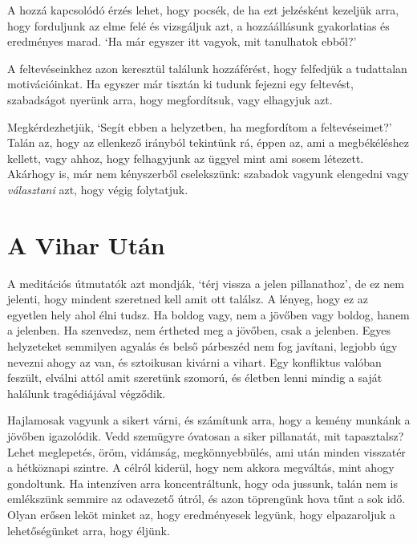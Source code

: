 
A hozzá kapcsolódó érzés lehet, hogy pocsék, de ha ezt jelzésként
kezeljük arra, hogy forduljunk az elme felé és vizsgáljuk azt, a
hozzáállásunk gyakorlatias és eredményes marad. `Ha már egyszer itt
vagyok, mit tanulhatok ebből?'

A feltevéseinkhez azon keresztül találunk hozzáférést, hogy felfedjük a
tudattalan motivációinkat. Ha egyszer már tisztán ki tudunk fejezni egy
feltevést, szabadságot nyerünk arra, hogy megfordítsuk, vagy elhagyjuk
azt.

Megkérdezhetjük, `Segít ebben a helyzetben, ha megfordítom a
feltevéseimet?' Talán az, hogy az ellenkező irányból tekintünk rá, éppen
az, ami a megbékéléshez kellett, vagy ahhoz, hogy felhagyjunk az üggyel
mint ami sosem létezett. Akárhogy is, már nem kényszerből cselekszünk:
szabadok vagyunk elengedni vagy \emph{választani} azt, hogy végig
folytatjuk.

\clearpage

\section{A Vihar Után}


\noindent A meditációs útmutatók azt mondják, `térj vissza a jelen
pillanathoz', de ez nem jelenti, hogy mindent szeretned kell amit ott
találsz. A lényeg, hogy ez az egyetlen hely ahol élni tudsz. Ha boldog
vagy, nem a jövőben vagy boldog, hanem a jelenben. Ha szenvedsz, nem
értheted meg a jövőben, csak a jelenben. Egyes helyzeteket semmilyen
agyalás és belső párbeszéd nem fog javítani, legjobb úgy nevezni ahogy
az van, és sztoikusan kivárni a vihart. Egy konfliktus valóban feszült,
elválni attól amit szeretünk szomorú, és életben lenni mindig a saját
halálunk tragédiájával végződik.

Hajlamosak vagyunk a sikert várni, és számítunk arra, hogy a kemény
munkánk a jövőben igazolódik. Vedd szemügyre óvatosan a siker
pillanatát, mit tapasztalsz? Lehet meglepetés, öröm, vidámság,
megkönnyebbülés, ami után minden visszatér a hétköznapi szintre. A
célról kiderül, hogy nem akkora megváltás, mint ahogy gondoltunk. Ha
intenzíven arra koncentráltunk, hogy oda jussunk, talán nem is
emlékszünk semmire az odavezető útról, és azon töprengünk hova tűnt a
sok idő. Olyan erősen leköt minket az, hogy eredményesek legyünk, hogy
elpazaroljuk a lehetőségünket arra, hogy éljünk.


